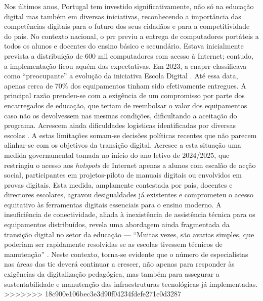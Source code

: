 Nos últimos anos, Portugal tem investido significativamente, não só na educação digital mas também em diversas iniciativas, reconhecendo a importância das competências digitais para o futuro dos seus cidadãos e para a competitividade do país. No contexto nacional, o \acrfull{prr} previu a entrega de computadores portáteis a todos os alunos e docentes do ensino básico e secundário. Estava inicialmente prevista a distribuição de 600 mil computadores com acesso à Internet; contudo, a implementação ficou aquém das expectativas. Em 2023, a \acrfull{cnaprr} classificava como ``preocupante'' a evolução da iniciativa Escola Digital \cite{PRREntregacomputadores}. Até essa data, apenas cerca de 70\% dos equipamentos tinham sido efetivamente entregues. A principal razão prendeu-se com a exigência de um compromisso por parte dos encarregados de educação, que teriam de reembolsar o valor dos equipamentos caso não os devolvessem nas mesmas condições, dificultando a aceitação do programa. Acrescem ainda dificuldades logísticas identificadas por diversas escolas \cite{PRREntregacomputadores}. A estas limitações somam-se decisões políticas recentes que não parecem alinhar-se com os objetivos da transição digital. Acresce a esta situação uma medida governamental tomada no início do ano letivo de 2024/2025, que restringiu o acesso aos \textit{hotspots} de Internet apenas a alunos com escalão de acção social, participantes em projetos-piloto de manuais digitais ou envolvidos em provas digitais. Esta medida, amplamente contestada por pais, docentes e directores escolares, agravou desigualdades já existentes e comprometeu o acesso equitativo às ferramentas digitais essenciais para o ensino moderno. A insuficiência de conectividade, aliada à inexistência de assistência técnica para os equipamentos distribuídos, revela uma abordagem ainda fragmentada da transição digital no setor da educação — ``Muitas vezes, são avarias simples, que poderiam ser rapidamente resolvidas se as escolas tivessem técnicos de manutenção'' \cite{ExecutiveDigest2024}.
Neste contexto, torna-se evidente que o número de especialistas nas áreas das \acrshort{tic} deverá continuar a crescer, não apenas para responder às exigências da digitalização pedagógica, mas também para assegurar a sustentabilidade e manutenção das infraestruturas tecnológicas já implementadas.
>>>>>>> 18c900e106bec3e3d90f04234fdefe271c0d3287

